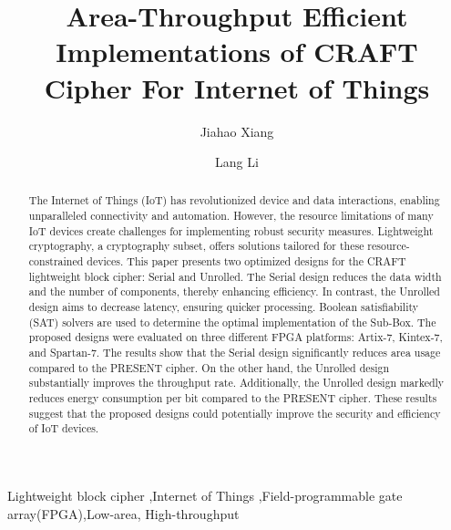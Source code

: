 \documentclass[final,5p,times,twocolumn]{elsarticle}
\begin{document}
\begin{frontmatter}

    \title{Area-Throughput Efficient Implementations of CRAFT Cipher For Internet of Things }

    \author[a,b]{Jiahao Xiang}
    \author[a,b]{Lang Li}







    \begin{abstract}
        The Internet of Things (IoT) has revolutionized device and data interactions, enabling unparalleled connectivity and automation. However, the resource limitations of many IoT devices create challenges for implementing robust security measures. Lightweight cryptography, a cryptography subset, offers solutions tailored for these resource-constrained devices.
        This paper presents two optimized designs for the CRAFT lightweight block cipher: Serial and Unrolled. The Serial design reduces the data width and the number of components, thereby enhancing efficiency. In contrast, the Unrolled design aims to decrease latency, ensuring quicker processing. Boolean satisfiability (SAT) solvers are used to determine the optimal implementation of the Sub-Box. 
        The proposed designs were evaluated on three different FPGA platforms: Artix-7, Kintex-7, and Spartan-7. The results show that the Serial design significantly reduces area usage compared to the PRESENT cipher. On the other hand, the Unrolled design substantially improves the throughput rate. Additionally, the Unrolled design markedly reduces energy consumption per bit compared to the PRESENT cipher.
        These results suggest that the proposed designs could potentially improve the security and efficiency of IoT devices.
    \end{abstract}


    \begin{keyword}
        Lightweight block cipher \sep Internet of Things  \sep Field-programmable gate array(FPGA)\sep  Low-area, High-throughput

    \end{keyword}

\end{frontmatter}
\end{document}
